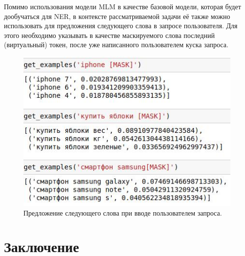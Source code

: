 \documentclass[12pt,a4paper]{article}
\begin{document}
\noindent Помимо использования модели MLM в качестве базовой модели, которая будет дообучаться для NER, в контексте рассматриваемой задачи её также можно использовать для предложения следующего слова в запросе пользователя. Для этого необходимо указывать в качестве маскируемого слова последний (виртуальный) токен, после уже написанного пользователем куска запроса.

\begin{figure}[H]
	\begin{center}
		\includegraphics[scale=0.8]{mlm2.jpg}
	\end{center}
	\caption{Предложение следующего слова при вводе пользователем запроса.}
\end{figure}

\section{Заключение}
\end{document}
